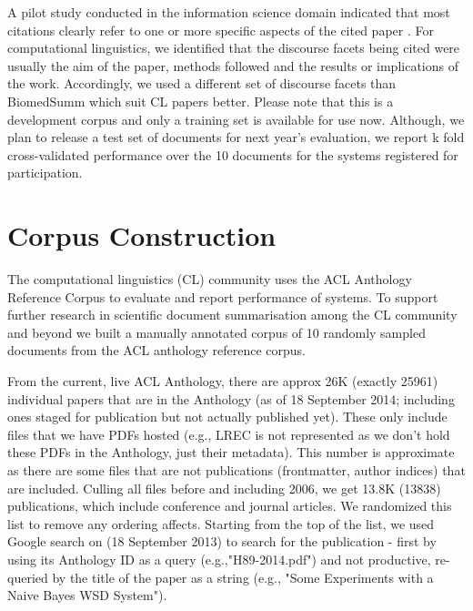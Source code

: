 \documentclass[11pt]{article}
\begin{document}

A pilot study conducted in the information science domain indicated that most citations clearly refer to one or more specific aspects of the cited paper \cite{jaidka2013}. For computational linguistics, we identified that the discourse facets being cited were usually the aim of the paper, methods followed and the results or implications of the work. Accordingly, we used a different set of discourse facets than BiomedSumm which suit CL papers better.	Please note that this is a development corpus and only a training set is available for use now. Although, we plan to release a test set of documents for next year’s evaluation, we report k fold cross-validated performance over the 10 documents for the systems registered for participation.

\section{Corpus Construction}
\label{corpus}
The computational linguistics (CL) community uses the ACL Anthology Reference Corpus \cite{bird2008} to evaluate and report performance of systems. To support further research in scientific document summarisation among the CL community and beyond we built a manually annotated  corpus of 10 randomly sampled documents  from the ACL anthology reference corpus.

From the current, live ACL Anthology, there are approx 26K (exactly 25961) individual papers that are in the Anthology (as of 18 September 2014; including ones staged for publication but not actually published yet). These only include files that we have PDFs hosted (e.g., LREC is not represented as we don't hold these PDFs in the Anthology, just their metadata). This number is approximate as there are some files that are not publications (frontmatter, author indices) that are included. Culling all files before and including 2006, we get 13.8K (13838) publications, which include conference and journal articles. We randomized this list to remove any ordering affects. Starting from the top of the list, we used Google search on (18 September 2013) to search for the publication - first by using its Anthology ID as a query (e.g.,"H89-2014.pdf") and not productive, re-queried by the title of the paper as a string (e.g., "Some Experiments with a Naive Bayes WSD System"). 
\end{document}
